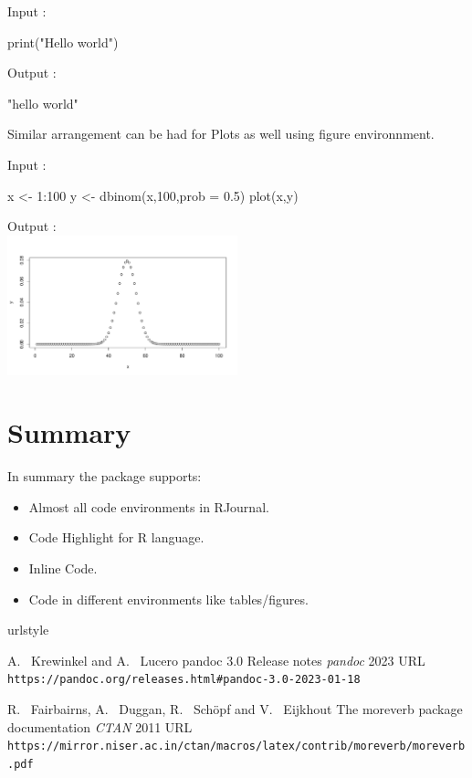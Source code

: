 \begin{Schunk}
Input :
\begin{Sinput}
print("Hello world")
\end{Sinput}
Output :
\begin{Soutput}
[1] "hello world"
\end{Soutput}
\end{Schunk}

Similar arrangement can be had for Plots as well using figure environnment.

\begin{Schunk}
Input :
\begin{Sinput}
x <- 1:100
y <- dbinom(x,100,prob = 0.5)
plot(x,y)
\end{Sinput}
Output :\\
\includegraphics[width=0.5\textwidth]{binom}
\end{Schunk}


\section{Summary}

In summary the  package supports:
\begin{itemize}
\item Almost all code environments in RJournal.
\item Code Highlight for R language.
\item Inline Code.
\item Code in different environments like tables/figures.
\end{itemize}



\begin{thebibliography}{99}
    \providecommand{\natexlab}[1]{#1}
    \providecommand{\url}[1]{\texttt{#1}}
    \expandafter\ifx\csname urlstyle\endcsname\relax
      \providecommand{\doi}[1]{doi: #1}\else
      \providecommand{\doi}{doi: \begingroup \urlstyle{rm}\Url}\fi

A.~ Krewinkel and A.~ Lucero
\newblock pandoc 3.0 Release notes
\newblock \emph{pandoc}  2023
\newblock URL \url{https://pandoc.org/releases.html#pandoc-3.0-2023-01-18}

R.~ Fairbairns, A.~ Duggan, R.~ Schöpf and V.~ Eijkhout
\newblock The moreverb package documentation
\newblock \emph{CTAN}  2011
\newblock URL \url{https://mirror.niser.ac.in/ctan/macros/latex/contrib/moreverb/moreverb.pdf}

\end{thebibliography}


\address{%
Abhishek Ulayil\\
Student, Institute of Actuaries of India\\%
Mumbai, India\\
ORCiD: 0009-0000-6935-8690\\
}
